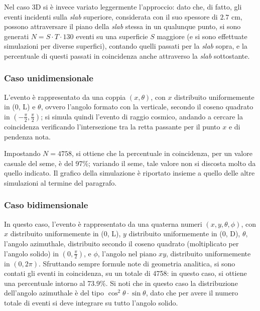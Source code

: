 Nel caso 3D si è invece variato leggermente l'approccio: dato che, di fatto, gli eventi incidenti sulla \emph{slab} superiore, considerata con il suo spessore di $2.7$ cm, possono attraversare il piano della \emph{slab} stessa in un qualunque punto, si sono generati $N=S\cdot T\cdot 130$ eventi su una superficie $S$ maggiore (e si sono effettuate simulazioni per diverse superfici), contando quelli passati per la \emph{slab} sopra, e la percentuale di questi passati in coincidenza anche attraverso la \emph{slab} sottostante.

\subsubsection{Caso unidimensionale}
L'evento è rappresentato da una coppia $(x, \theta)$, con $x$ distribuito uniformemente in (0, L) e $\theta$, ovvero l'angolo formato con la verticale, secondo il coseno quadrato in $(-\frac{\pi}{2}, \frac{\pi}{2})$; si simula quindi l'evento di raggio cosmico, andando a cercare la coincidenza verificando l'intersezione tra la retta passante per il punto $x$ e di pendenza nota.

Impostando $N = 4758$, si ottiene che la percentuale in coincidenza, per un valore casuale del seme, è del 97\%; variando il seme, tale valore non si discosta molto da quello indicato. Il grafico della simulazione è riportato insieme a quello delle altre simulazioni al termine del paragrafo.

\subsubsection{Caso bidimensionale}
In questo caso, l'evento è rappresentato da una quaterna numeri $(x,y,\theta,\phi)$, con $x$ distribuito uniformemente in (0, L), $y$ distribuito uniformemente in (0, D), $\theta$, l'angolo azimuthale, distribuito secondo il coseno quadrato (moltiplicato per l'angolo solido) in $(0, \frac{\pi}{2})$, e $\phi$, l'angolo nel piano $xy$, distribuito uniformemente in $(0, 2\pi)$. Sfruttando sempre formule note di geometria analitica, si sono contati gli eventi in coincidenza, su un totale di 4758: in questo caso, si ottiene una percentuale intorno al 73.9\%.
Si noti che in questo caso la distribuzione dell'angolo azimuthale è del tipo $\cos ^2\theta \cdot \sin\theta$, dato che per avere il numero totale di eventi si deve integrare su tutto l'angolo solido.

